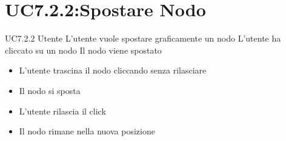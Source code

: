\documentclass[../AnalisideiRequisiti.tex]{subfiles}
\begin{document}
\section{UC7.2.2:Spostare Nodo}
\UserCase
{UC7.2.2}
{Utente}
{}
{L'utente vuole spostare graficamente un nodo}
{L'utente ha cliccato su un nodo}
{Il nodo viene spostato}
{}
{\begin{itemize}
		\item{} L'utente trascina il nodo cliccando senza rilasciare
		\item{} Il nodo si sposta
		\item{} L'utente rilascia il click
		\item{} Il nodo rimane nella nuova posizione
\end{itemize}}
\begin{comment}

\section{UC3:Esportazione stato del Grafo}
\UserCase
{UC3}
{Utente}
{Speect}
{L'utente vuole esportare lo stato del grafo}
{Esiste un grafo esportabile}
{Il grafo viene esportato in file}
{ L'utente visualizza un messaggio di errore \refer{UC3.1}}
{}

\section{UC3.1:Errore Esportazione Grafo}
\UserCase
{UC3.1}
{Speect}
{Utente}
{Avviene un errore durante l'esportazione}
{L'Utente ha cercato di esportare un grafo}
{Viene visualizzato l'errore e nessuna operazione viene eseguita}
{}
{}
\section{UC4:Importa Grafo}
\UserCase
{UC4}
{Utente}
{Speect}
{L'utente vuole importare lo stato del grafo}
{Esiste un grafo esportabile}
{Il grafo viene importato da file}
{L'utente visualizza un messaggio di errore \refer{UC4.1}}
{}
\section{UC4.1:Errore Importazione Grafo}
\UserCase
{UC4.1}
{Speect}
{Utente}
{Avviene un errore durante l'importazione}
{L'Utente ha cercato di importare un file scorretto}
{Viene visualizzato l'errore e nessuna operazione viene eseguita}
{}
{}
\section{UC7:Modifica Visualizzazione Layer}
\UserCase
{UC7}
{Utente}
{}
{L'Utente sceglie quali relazioni mostrare}
{Esiste un grafo visualizzato coerentemente alle opzioni selezionate}
{Vengono mostrati tutti i layer di relazione selezionati}
{}
{}


\end{comment}
\end{document}
